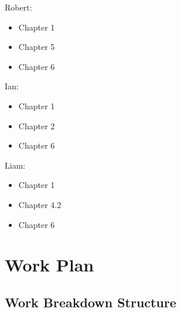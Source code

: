 \documentclass[titlepage, draft]{article}
\begin{document}
Robert:
\begin{itemize}
	\item Chapter 1
	\item Chapter 5
	\item Chapter 6
\end{itemize}

Ian:
\begin{itemize}
	\item Chapter 1
	\item Chapter 2
	\item Chapter 6
\end{itemize}

Liam:
\begin{itemize}
	\item Chapter 1
	\item Chapter 4.2
	\item Chapter 6
\end{itemize}

\section{Work Plan}

\subsection{Work Breakdown Structure}
\end{document}
